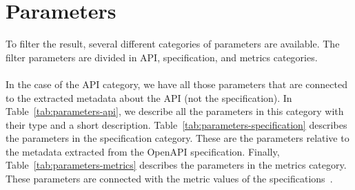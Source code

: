 \section{Parameters}\label{sec:parameters}
To filter the result, several different categories of parameters are available.
The filter parameters are divided in API, specification, and metrics categories. \\ \\
In the case of the API category, we have all those parameters that are connected to the extracted metadata about the API (not the specification).
In Table~\ref{tab:parameters-api}, we describe all the parameters in this category with their type and a short description.
Table~\ref{tab:parameters-specification} describes the parameters in the specification category.
These are the parameters relative to the metadata extracted from the OpenAPI specification.
Finally, Table~\ref{tab:parameters-metrics} describes the parameters in the metrics category.
These parameters are connected with the metric values of the specifications~\cite{souhaila_serbout_apistic_2024}.

